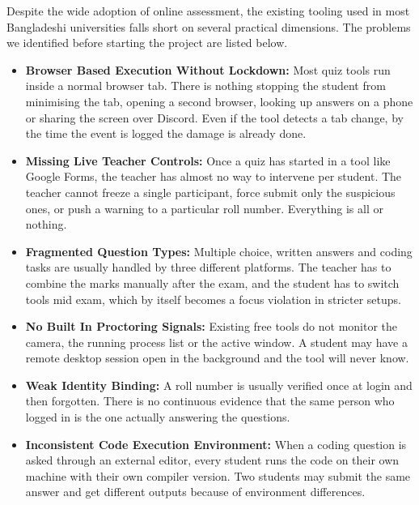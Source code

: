 \documentclass[12pt, a4paper]{report}
\begin{document}
\begin{justify}
  {\fontsize{12}{18}\selectfont
    Despite the wide adoption of online assessment, the existing tooling used in most Bangladeshi universities falls short on several practical dimensions. The problems we identified before starting the project are listed below.

    \begin{itemize}
        \item \textbf{Browser Based Execution Without Lockdown:} Most quiz tools run inside a normal browser tab. There is nothing stopping the student from minimising the tab, opening a second browser, looking up answers on a phone or sharing the screen over Discord. Even if the tool detects a tab change, by the time the event is logged the damage is already done.

        \item \textbf{Missing Live Teacher Controls:} Once a quiz has started in a tool like Google Forms, the teacher has almost no way to intervene per student. The teacher cannot freeze a single participant, force submit only the suspicious ones, or push a warning to a particular roll number. Everything is all or nothing.

        \item \textbf{Fragmented Question Types:} Multiple choice, written answers and coding tasks are usually handled by three different platforms. The teacher has to combine the marks manually after the exam, and the student has to switch tools mid exam, which by itself becomes a focus violation in stricter setups.

        \item \textbf{No Built In Proctoring Signals:} Existing free tools do not monitor the camera, the running process list or the active window. A student may have a remote desktop session open in the background and the tool will never know.

        \item \textbf{Weak Identity Binding:} A roll number is usually verified once at login and then forgotten. There is no continuous evidence that the same person who logged in is the one actually answering the questions.

        \item \textbf{Inconsistent Code Execution Environment:} When a coding question is asked through an external editor, every student runs the code on their own machine with their own compiler version. Two students may submit the same answer and get different outputs because of environment differences.


\end{itemize}}
\end{justify}
\end{document}
